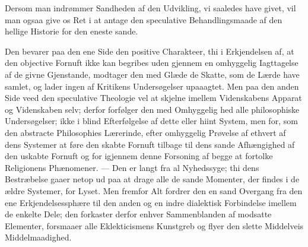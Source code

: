 \documentclass[12pt]{book}
\newcommand{\opage}[1]{\marginnote{\footnotesize\textit{[#1]}}}
\begin{document}
Dersom man indrømmer Sandheden af den Udvikling, vi saaledes have givet, vil man
ogsaa give os Ret i at antage den speculative Behandlingsmaade af den hellige
Historie for den eneste sande.

Den bevarer paa den ene Side den positive Charakteer, thi i Erkjendelsen af, at
den objective Fornuft ikke kan begribes uden gjennem en omhyggelig Iagttagelse
af de givne Gjenstande, modtager den med Glæde de Skatte, som de Lærde have
samlet, og lader ingen af Kritikens Undersøgelser upaaagtet. Men paa den anden
Side veed den speculative Theologie vel at skjelne imellem Videnskabens Apparat
og Videnskaben selv; derfor forfølger den med Omhyggelig\-%
\opage{162}%
hed alle philosophiske Undersøgelser; ikke i blind Efterfølgelse af dette eller
hiint System, men for, som den abstracte Philosophies Lærerinde, efter omhyggelig
Prøvelse af ethvert af dens Systemer at føre den skabte Fornuft tilbage til dens
sande Afhængighed af den uskabte Fornuft og for igjennem denne Forsoning af
begge at fortolke Religionens Phænomener. --- Den er langt fra al Nyhedssyge;
thi dens Bestræbelse gaaer netop ud paa at drage alle de sande Momenter, der
findes i de ældre Systemer, for Lyset. Men fremfor Alt fordrer den en sand
Overgang fra den ene Erkjendelsessphære til den anden og en indre dialektisk
Forbindelse imellem de enkelte Dele; den forkaster derfor enhver Sammenblanden
af modsatte Elementer, forsmaaer alle Eklekticismens Kunstgreb og flyer den
slette Middelveis Middelmaadighed.
\end{document}

